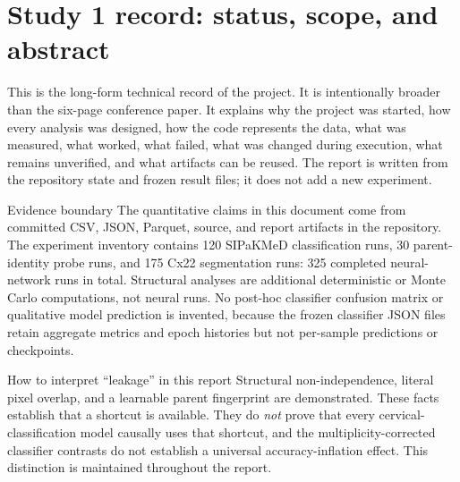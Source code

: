 \chapter{Study 1 record: status, scope, and abstract}\label{s1:ch:ch00_status_scope}


This is the long-form technical record of the \cytofair{} project. It is intentionally broader than the six-page conference paper. It explains why the project was started, how every analysis was designed, how the code represents the data, what was measured, what worked, what failed, what was changed during execution, what remains unverified, and what artifacts can be reused. The report is written from the repository state and frozen result files; it does not add a new experiment.

\begin{keybox}{Evidence boundary}
The quantitative claims in this document come from committed CSV, JSON, Parquet, source, and report artifacts in the repository. The experiment inventory contains 120 SIPaKMeD classification runs, 30 parent-identity probe runs, and 175 Cx22 segmentation runs: 325 completed neural-network runs in total. Structural analyses are additional deterministic or Monte Carlo computations, not neural runs. No post-hoc classifier confusion matrix or qualitative model prediction is invented, because the frozen classifier JSON files retain aggregate metrics and epoch histories but not per-sample predictions or checkpoints.
\end{keybox}

\begin{warningbox}{How to interpret ``leakage'' in this report}
Structural non-independence, literal pixel overlap, and a learnable parent fingerprint are demonstrated. These facts establish that a shortcut is available. They do \emph{not} prove that every cervical-classification model causally uses that shortcut, and the multiplicity-corrected classifier contrasts do not establish a universal accuracy-inflation effect. This distinction is maintained throughout the report.
\end{warningbox}

